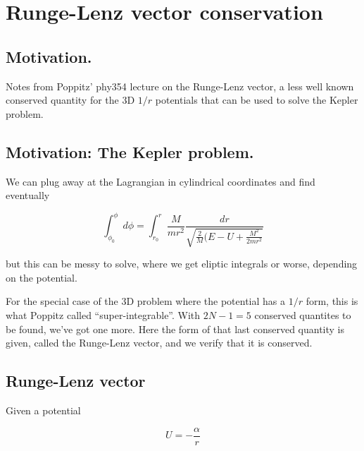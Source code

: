 
%

\chapter{Runge-Lenz vector conservation}
\label{chap:RungeLenz}
{}
\date{Feb 11, 2012}

\beginArtWithToc

\section{Motivation.}

Notes from Poppitz' phy354 lecture on the Runge-Lenz vector, a less well known conserved quantity for the 3D $1/r$ potentials that can be used to solve the Kepler problem.

\section{Motivation: The Kepler problem.}

We can plug away at the Lagrangian in cylindrical coordinates and find eventually

\begin{equation}\label{eqn:RungeLenz:n}
\int_{\phi_0}^\phi d\phi = \int_{r_0}^r \frac{M}{m r^2} \frac{dr}{\sqrt{\frac{2}{M} ( E - U + \frac{M^2}{2 m r^2}}}
\end{equation}

but this can be messy to solve, where we get eliptic integrals or worse, depending on the potential.

For the special case of the 3D problem where the potential has a $1/r$ form, this is what Poppitz called ``super-integrable''.  With $2N - 1 = 5$ conserved quantites to be found, we've got one more.  Here the form of that last conserved quantity is given, called the Runge-Lenz vector, and we verify that it is conserved.

\section{Runge-Lenz vector}

Given a potential

\begin{equation}\label{eqn:RungeLenz:n}
U = -\frac{\alpha}{r}
\end{equation}

